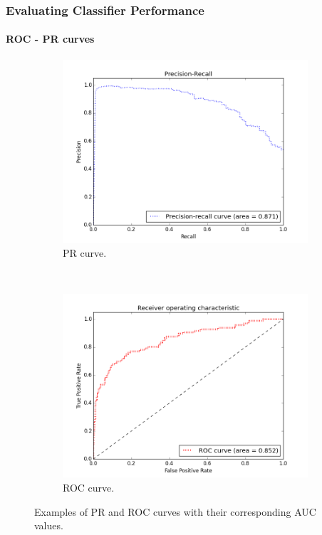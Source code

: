 \documentclass{beamer}
\begin{document}
\begin{frame}[noframenumbering]
    \frametitle{Evaluating Classifier Performance}  %
    \framesubtitle{ROC - PR curves}
    \begin{figure}[!htb]
        \centering
        \begin{subfigure}[t]{0.5\textwidth}
            \centering
            \includegraphics[width=\textwidth]{fig/Psv_1_2_fine_PR}
            \caption{PR curve.}
        \end{subfigure}%
        ~
        \begin{subfigure}[t]{0.5\textwidth}
            \centering
            \includegraphics[width=\textwidth]{fig/Psv_1_2_fine_ROC}
            \caption{ROC curve.}
        \end{subfigure}
        \caption{Examples of PR and ROC curves with their corresponding AUC values.}
        \label{fig:PRRocExamples}
    \end{figure}
\end{frame}
\end{document}
